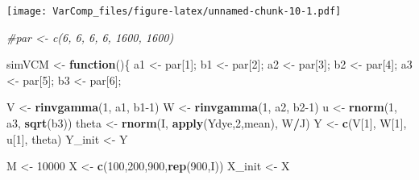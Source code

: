 \documentclass[
]{article}
\newenvironment{Shaded}{\begin{snugshade}}{\end{snugshade}}
\newcommand{\CommentTok}[1]{\textcolor[rgb]{0.56,0.35,0.01}{\textit{#1}}}
\newcommand{\ControlFlowTok}[1]{\textcolor[rgb]{0.13,0.29,0.53}{\textbf{#1}}}
\newcommand{\DecValTok}[1]{\textcolor[rgb]{0.00,0.00,0.81}{#1}}
\newcommand{\FunctionTok}[1]{\textcolor[rgb]{0.13,0.29,0.53}{\textbf{#1}}}
\newcommand{\NormalTok}[1]{#1}
\newcommand{\OtherTok}[1]{\textcolor[rgb]{0.56,0.35,0.01}{#1}}
\newcommand{\SpecialCharTok}[1]{\textcolor[rgb]{0.81,0.36,0.00}{\textbf{#1}}}
\begin{document}
\texttt{[image: VarComp\_files/figure-latex/unnamed-chunk-10-1.pdf]}

\begin{Shaded}
\begin{Highlighting}[]
\CommentTok{\#par \textless{}{-} c(6, 6, 6, 6, 1600, 1600)}

\NormalTok{simVCM }\OtherTok{\textless{}{-}} \ControlFlowTok{function}\NormalTok{()\{}
\NormalTok{  a1 }\OtherTok{\textless{}{-}}\NormalTok{ par[}\DecValTok{1}\NormalTok{]; b1 }\OtherTok{\textless{}{-}}\NormalTok{ par[}\DecValTok{2}\NormalTok{]; a2 }\OtherTok{\textless{}{-}}\NormalTok{ par[}\DecValTok{3}\NormalTok{]; b2 }\OtherTok{\textless{}{-}}\NormalTok{ par[}\DecValTok{4}\NormalTok{]; a3 }\OtherTok{\textless{}{-}}\NormalTok{ par[}\DecValTok{5}\NormalTok{]; b3 }\OtherTok{\textless{}{-}}\NormalTok{ par[}\DecValTok{6}\NormalTok{];}
  
\NormalTok{  V }\OtherTok{\textless{}{-}} \FunctionTok{rinvgamma}\NormalTok{(}\DecValTok{1}\NormalTok{, a1, b1}\DecValTok{{-}1}\NormalTok{)}
\NormalTok{  W }\OtherTok{\textless{}{-}} \FunctionTok{rinvgamma}\NormalTok{(}\DecValTok{1}\NormalTok{, a2, b2}\DecValTok{{-}1}\NormalTok{)}
\NormalTok{  u }\OtherTok{\textless{}{-}} \FunctionTok{rnorm}\NormalTok{(}\DecValTok{1}\NormalTok{, a3, }\FunctionTok{sqrt}\NormalTok{(b3))}
\NormalTok{  theta }\OtherTok{\textless{}{-}} \FunctionTok{rnorm}\NormalTok{(I, }\FunctionTok{apply}\NormalTok{(Ydye,}\DecValTok{2}\NormalTok{,mean), W}\SpecialCharTok{/}\NormalTok{J)}
\NormalTok{  Y }\OtherTok{\textless{}{-}} \FunctionTok{c}\NormalTok{(V[}\DecValTok{1}\NormalTok{], W[}\DecValTok{1}\NormalTok{], u[}\DecValTok{1}\NormalTok{], theta)}
\NormalTok{  Y\_init }\OtherTok{\textless{}{-}}\NormalTok{ Y}

\NormalTok{  M }\OtherTok{\textless{}{-}} \DecValTok{10000}
\NormalTok{  X }\OtherTok{\textless{}{-}} \FunctionTok{c}\NormalTok{(}\DecValTok{100}\NormalTok{,}\DecValTok{200}\NormalTok{,}\DecValTok{900}\NormalTok{,}\FunctionTok{rep}\NormalTok{(}\DecValTok{900}\NormalTok{,I))}
\NormalTok{  X\_init }\OtherTok{\textless{}{-}}\NormalTok{ X}
  

\end{Highlighting}
\end{Shaded}
\end{document}
